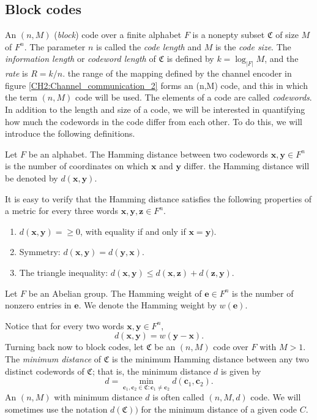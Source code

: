\subsection{Block codes}
An $(n,M)$ (\textit{block}) code over a finite alphabet $F$ is a nonepty subset $\mathfrak{C}$ of size $M$ of $F^n$. The parameter $n$ is called the \textit{code length} and $M$ is the \textit{code size}. The \textit{information length} or \textit{codeword length} of $\mathfrak{C}$ is defined by $k=\log_{|F|}M$, and the \textit{rate} is $R=k/n$. the range of the mapping defined by the channel encoder in figure \ref{CH2:Channel_communication_2} forms an (n,M) code, and this in which the term $(n,M)$ code will be used. The elements of a code are called \textit{codewords}.\\
\indent In addition to the length and size of a code, we will be interested in quantifying how much the codewords in the code differ from each other. To do this, we will introduce the following definitions.
\begin{definition}
Let $F$ be an alphabet. The Hamming distance between two codewords $\mathbf{x},\mathbf{y}\in F^n$ is the number of coordinates on which $\mathbf{x}$ and $\mathbf{y}$ differ. the Hamming distance will be denoted by $d(\mathbf{x},\mathbf{y})$.
\end{definition}
\indent It is easy to verify that the Hamming distance satisfies the following properties of a metric for every three words $\mathbf{x},\mathbf{y},\mathbf{z}\in F^n$.
\begin{enumerate}[label=(\roman*)]
\item $d(\mathbf{x},\mathbf{y})=\geq 0$, with equality if and only if $\mathbf{x}=\mathbf{y})$.
\item Symmetry: $d(\mathbf{x},\mathbf{y})=d(\mathbf{y},\mathbf{x})$.
\item The triangle inequality: $d(\mathbf{x},\mathbf{y}) \leq d(\mathbf{x},\mathbf{z})+ d(\mathbf{z},\mathbf{y})$.
\end{enumerate}
\begin{definition}
Let $F$ be an Abelian group. The Hamming weight of $\mathbf{e}\in F^n$ is the number of nonzero entries in $\mathbf{e}$. We denote the Hamming weight by $w(\mathbf{e})$.
\end{definition}
\indent Notice that for every two words $\mathbf{x}, \mathbf{y}\in F^n$,
\begin{equation}
d(\mathbf{x},\mathbf{y}) = w(\mathbf{y}-\mathbf{x}).
\end{equation}
Turning back now to block codes, let $\mathfrak{C}$ be an $(n,M)$ code over $F$ with $M>1$. The \textit{minimum distance} of $\mathfrak{C}$ is the minimum Hamming distance between any two distinct codewords of $\mathfrak{C}$; that is, the minimum distance $d$ is given by
\begin{equation}
d=\min_{\mathbf{c}_1,\mathbf{c}_2\in \mathfrak{C} : \mathbf{c}_1\neq \mathbf{c}_2} d(\mathbf{c}_1,\mathbf{c}_2).
\end{equation}
An $(n,M)$ with minimum distance $d$ is often called $(n,M,d)$ code. We will sometimes use the notation $d(\mathfrak{C}))$ for the minimum distance of a given code $C$.
